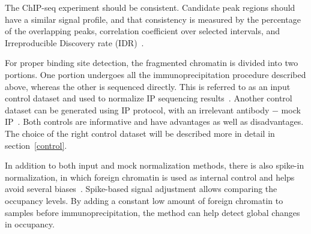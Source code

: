 The ChIP-seq experiment should be consistent. 
Candidate peak regions should have a similar signal profile, and that consistency is measured by the percentage of the overlapping peaks, correlation coefficient over selected intervals, and Irreproducible Discovery rate (IDR)~\cite{shin2013computational}.

For proper binding site detection, the fragmented chromatin is divided into two portions. 
One portion undergoes all the immunoprecipitation procedure described above, whereas the other is sequenced directly. 
This is referred to as an input control dataset and used to normalize IP sequencing results~\cite{kidder2011chip}. 
Another control dataset can be generated using IP protocol, with an irrelevant antibody $-$ mock IP~\cite{flensburg2014comparison}. 
Both controls are informative and have advantages as well as disadvantages.
The choice of the right control dataset will be described more in detail in section~\ref{control}.

In addition to both input and mock normalization methods, there is also spike-in normalization, in which foreign chromatin is used as internal control and helps avoid several biases~\cite{bonhoure2014quantifying}.
Spike-based signal adjustment allows comparing the occupancy levels. 
By adding a constant low amount of foreign chromatin to samples before immunoprecipitation, the method can help detect global changes in occupancy. 
